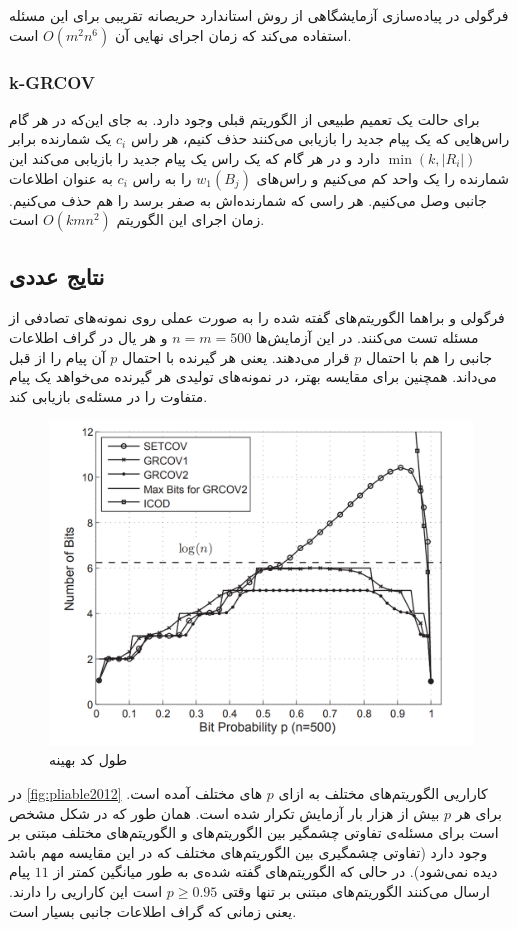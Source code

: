  فرگولی در پیاده‌سازی آزمایشگاهی از روش استاندارد حریصانه تقریبی برای این مسئله استفاده می‌کند که زمان اجرای نهایی آن
 $O(m^2 n^6)$
 است.
\subsubsection{k-GRCOV}
برای حالت
\picodt
یک تعمیم طبیعی از الگوریتم قبلی وجود دارد. به جای این‌که در هر گام راس‌هایی که یک پیام جدید را بازیابی می‌کنند حذف کنیم، هر راس 
$c_i$
یک شمارنده برابر
$\min(k, |R_i|)$
دارد و در هر گام که یک راس یک پیام جدید را بازیابی می‌کند این شمارنده را یک واحد کم می‌کنیم و راس‌های
$w_1(B_j)$
را به راس
$c_i$
به عنوان اطلاعات جانبی وصل می‌کنیم. هر راسی که شمارنده‌اش به صفر برسد را هم حذف می‌کنیم. زمان اجرای این الگوریتم
$O(kmn^2)$
است.

\subsection{
نتایج عددی
}
فرگولی و براهما الگوریتم‌های گفته شده را به صورت عملی روی نمونه‌های تصادفی از مسئله تست می‌کنند. در این آزمایش‌ها 
$n = m = 500$
و هر یال در گراف اطلاعات جانبی را هم با احتمال
$p$
قرار می‌دهند. یعنی هر گیرنده با احتمال
$p$
آن پیام را از قبل می‌داند. همچنین برای مقایسه بهتر، در نمونه‌های تولیدی هر گیرنده می‌خواهد یک پیام متفاوت را در مسئله‌ی
\icod
بازیابی کند.
\begin{figure}
	\centering
	\includegraphics[width=0.7\linewidth]{figs/ch3/pliable2012}
	\caption[
	طول کد بهینه
	]{طول کد بهینه\cite{pliablefirstpaper}}
	\label{fig:pliable2012}
\end{figure}

در 
\autoref{fig:pliable2012}
کاراریی الگوریتم‌های مختلف به ازای 
$p$
های مختلف آمده است. برای هر
$p$
بیش از هزار بار آزمایش تکرار شده است. همان طور که در شکل مشخص است برای مسئله‌ی \picod تفاوتی چشمگیر بین الگوریتم‌های
\picod
و الگوریتم‌های مختلف مبتنی بر
\icod
وجود دارد (تفاوتی چشمگیری بین الگوریتم‌های مختلف
\icod
که در این مقایسه مهم باشد دیده نمی‌شود). در حالی که الگوریتم‌های گفته شده‌ی
\picod
به طور میانگین کمتر از
$11$
پیام ارسال می‌کنند الگوریتم‌های مبتنی بر
\icod
تنها وقتی
$p \geq 0.95$
است این کاراریی را دارند. یعنی زمانی که گراف اطلاعات جانبی بسیار  است.

